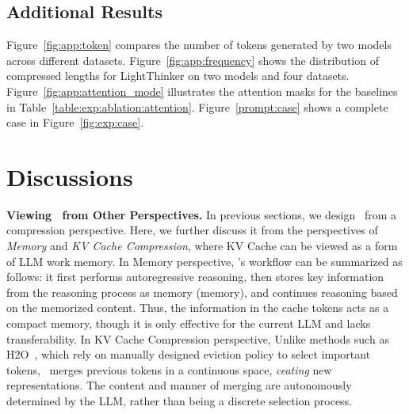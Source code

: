 \subsection{Additional Results}
\label{sec:app:exp:additional_results}
Figure~\ref{fig:app:token} compares the number of tokens generated by two models across different datasets. 
Figure~\ref{fig:app:frequency} shows the distribution of compressed lengths for LightThinker on two models and four datasets. Figure~\ref{fig:app:attention_mode} illustrates the attention masks for the baselines in Table~\ref{table:exp:ablation:attention}.
Figure~\ref{prompt:case} shows a complete case in Figure~\ref{fig:exp:case}.

\begin{figure*}[!htbp] %
    \centering
    \caption{Average number of generated tokens.}
    \label{fig:app:token}
\end{figure*} 



\section{Discussions}
\label{sec:app:discussion}
\textbf{Viewing \ours~from Other Perspectives.}
In previous sections, we design \ours~from a compression perspective. 
Here, we further discuss it from the perspectives of \textit{Memory} and \textit{KV Cache Compression}, where KV Cache can be viewed as a form of LLM work memory.
In Memory perspective, \ours's workflow can be summarized as follows: it first performs autoregressive reasoning, then stores key information from the reasoning process as memory (memory), and continues reasoning based on the memorized content. 
Thus, the information in the cache tokens acts as a compact memory, though it is only effective for the current LLM and lacks transferability.
In KV Cache Compression perspective,
Unlike methods such as H2O~\citep{nips23_h2o}, which rely on manually designed eviction policy to select important tokens, \ours~merges previous tokens in a continuous space, \textit{ceating} new representations. 
The content and manner of merging are autonomously determined by the LLM, rather than being a discrete selection process.


